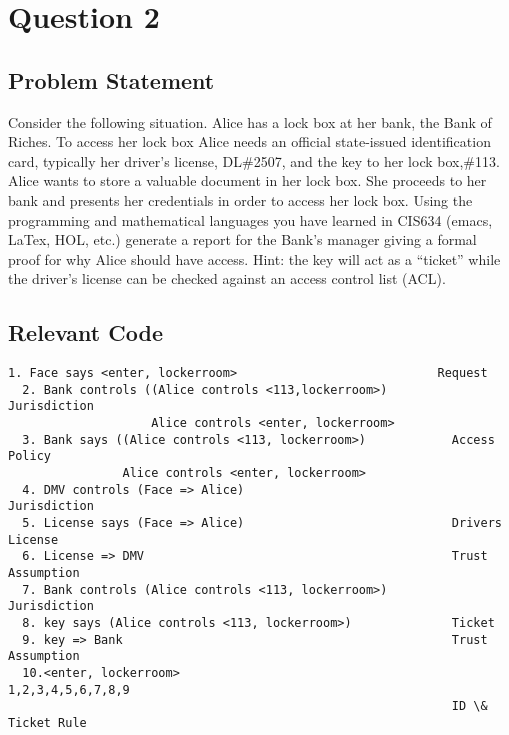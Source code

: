 \documentclass{report}
\begin{document}

 \chapter{Question 2}
 \label{cha:ques2}
  
 \section{Problem Statement}
 \label{sec:problem-statement-2}

Consider the following situation. Alice has a lock box at her bank, the Bank of Riches. To
access her lock box Alice needs an official state-issued identification card, typically her driver’s
license, DL\#2507, and the key to her lock box,\#113.
Alice wants to store a valuable document in her lock box. She proceeds to her bank and
presents her credentials in order to access her lock box. Using the programming and
mathematical languages you have learned in CIS634 (emacs, LaTex, HOL, etc.) generate a report
for the Bank’s manager giving a formal proof for why Alice should have access. Hint: the key
will act as a “ticket” while the driver’s license can be checked against an access control list
(ACL).

\section{Relevant Code}
\label{sec:relevant-code-2}


\lstset{frameround=tttt}
\begin{lstlisting}[frame=tRBL]
  1. Face says <enter, lockerroom>                            Request
  2. Bank controls ((Alice controls <113,lockerroom>)         Jurisdiction
                    Alice controls <enter, lockerroom>
  3. Bank says ((Alice controls <113, lockerroom>)            Access Policy 
                Alice controls <enter, lockerroom>
  4. DMV controls (Face => Alice)                             Jurisdiction
  5. License says (Face => Alice)                             Drivers License
  6. License => DMV                                           Trust Assumption
  7. Bank controls (Alice controls <113, lockerroom>)         Jurisdiction
  8. key says (Alice controls <113, lockerroom>)              Ticket
  9. key => Bank                                              Trust Assumption
  10.<enter, lockerroom>                                      1,2,3,4,5,6,7,8,9
                                                              ID \& Ticket Rule    
\end{lstlisting}
\end{document}
